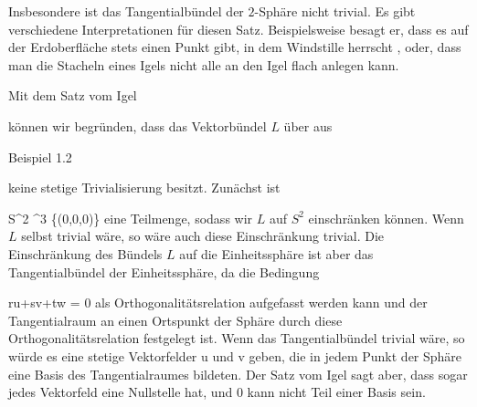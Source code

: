{





\faktzusatz {}
\faktzusatz {}





}

Insbesondere ist das Tangentialbündel der $2$-Sphäre nicht trivial. Es gibt verschiedene Interpretationen für diesen Satz. Beispielsweise besagt er, dass es auf der Erdoberfläche stets einen Punkt gibt, in dem Windstille herrscht
 {} {,}
oder, dass man die Stacheln eines Igels nicht alle an den Igel flach anlegen kann.

{}
{





Mit
dem
Satz vom Igel

können wir begründen, dass das Vektorbündel $L$ über
 aus

Beispiel 1.2

keine stetige Trivialisierung besitzt. Zunächst ist

\mavergleichskette
{\vergleichskette
{S^2
}
{ \subset }{\R^3 \setminus \{(0,0,0)\}
}
{  }{
}
{    }{
}
{   }{
}
}
{}{}{}
eine Teilmenge, sodass wir $L$ auf $S^2$ einschränken können. Wenn $L$ selbst trivial wäre, so wäre auch diese Einschränkung trivial. Die Einschränkung des Bündels $L$ auf die Einheitssphäre ist aber das Tangentialbündel der Einheitssphäre, da die Bedingung

\mavergleichskettedisp
{\vergleichskette
{ru+sv+tw
}
{ =} { 0
}
{ } {
}
{ } {
}
{ } {
}
}
{}{}{}
als Orthogonalitätsrelation aufgefasst werden kann und der
 {} {}
Tangentialraum an einen Ortspunkt
 der Sphäre durch diese Orthogonalitätsrelation festgelegt ist. Wenn das Tangentialbündel trivial wäre, so würde es eine stetige Vektorfelder
\mathkor {} {u} {und} {v} {}
geben, die in jedem Punkt der Sphäre eine Basis des Tangentialraumes bildeten. Der Satz vom Igel sagt aber, dass sogar jedes Vektorfeld eine Nullstelle hat, und $0$ kann nicht Teil einer Basis sein.





}





